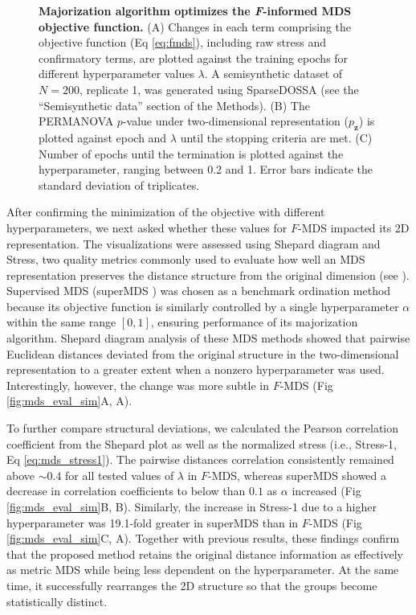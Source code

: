 \documentclass[10pt,letterpaper]{article}
\newcommand{\1}{{\rm 1}\kern-0.24em{\rm I}}
\begin{document}
\begin{figure}[h!]
    \centering
    \caption{\textbf{Majorization algorithm optimizes the \textit{F}-informed MDS objective function.} (A) Changes in each term comprising the objective function (Eq \ref{eq:fmds}), including raw stress and confirmatory terms, are plotted against the training epochs for different hyperparameter values $\lambda$. A semisynthetic dataset of $N=200$, replicate 1, was generated using SparseDOSSA \cite{Ma21} (see the ``Semisynthetic data'' section of the Methods). (B) The PERMANOVA $p$-value under two-dimensional representation ($p_\mathbf{z}$) is plotted against epoch and $\lambda$ until the stopping criteria are met. (C) Number of epochs until the termination is plotted against the hyperparameter, ranging between 0.2 and 1. Error bars indicate the standard deviation of triplicates.}
    \label{fig:sim_iter}
\end{figure}


After confirming the minimization of the objective with different hyperparameters, we next asked whether these values for $F$-MDS impacted its 2D representation. The visualizations were assessed using Shepard diagram and Stress, two quality metrics commonly used to evaluate how well an MDS representation preserves the distance structure from the original dimension (see ). Supervised MDS (superMDS \cite{witten11}) was chosen as a benchmark ordination method because its objective function is similarly controlled by a single hyperparameter $\alpha$ within the same range $[0,1]$, ensuring performance of its majorization algorithm. Shepard diagram analysis of these MDS methods showed that pairwise Euclidean distances deviated from the original structure in the two-dimensional representation to a greater extent when a nonzero hyperparameter was used. Interestingly, however, the change was more subtle in $F$-MDS (Fig \ref{fig:mds_eval_sim}A, A). 

To further compare structural deviations, we calculated the Pearson correlation coefficient from the Shepard plot as well as the normalized stress (i.e., Stress-1, Eq \ref{eq:mds_stress1}). The pairwise distances correlation consistently remained above $\sim\!0.4$ for all tested values of $\lambda$ in $F$-MDS, whereas superMDS showed a decrease in correlation coefficients to below than $0.1$ as $\alpha$ increased (Fig \ref{fig:mds_eval_sim}B, B). Similarly, the increase in Stress-1 due to a higher hyperparameter was 19.1-fold greater in superMDS than in $F$-MDS (Fig \ref{fig:mds_eval_sim}C, A). Together with previous results, these findings confirm that the proposed method retains the original distance information as effectively as metric MDS while being less dependent on the hyperparameter. At the same time, it successfully rearranges the 2D structure so that the groups become statistically distinct. 
\end{document}
